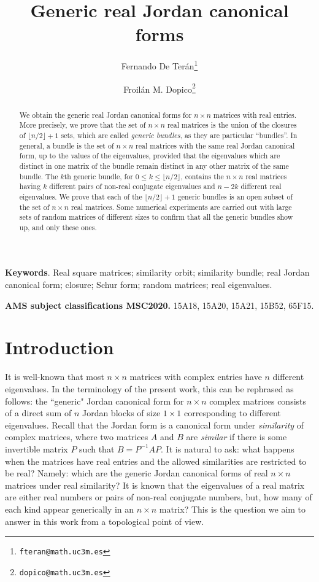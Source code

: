 \documentclass[a4paper]{article}
\title{Generic real Jordan canonical forms}
\author[1]{Fernando De Ter\'an\thanks{\tt fteran@math.uc3m.es}}
\author[1] {Froil\'an M. Dopico\thanks{\tt dopico@math.uc3m.es}}
\affil[1]{Universidad Carlos III de Madrid, ROR: https://ror.org/03ths8210, Departamento de Matemáticas, Avda. Universidad 30, 28911, Legan\'es, Spain}
\date{}
\begin{document}
\maketitle

\begin{abstract}
    We obtain the generic real Jordan canonical forms for $n\times n$ matrices with real entries. More precisely, we prove that the set of $n\times n$ real matrices is the union of the closures of $\lfloor n/2\rfloor+1$ sets, which are called {\em generic bundles}, as they are particular ``bundles''.  In general, a bundle is the set of $n\times n$ real matrices with the same real Jordan canonical form, up to the values of the eigenvalues, provided that the eigenvalues which are distinct in one matrix of the bundle remain distinct in any other matrix of the same bundle. The $k$th generic bundle, for $0\leq k\leq\lfloor n/2\rfloor$, contains the $n\times n$ real matrices having $k$ different pairs of non-real conjugate eigenvalues and $n-2k$ different real eigenvalues. We prove that each of the $\lfloor n/2\rfloor+1$ generic bundles is an open subset of the set of $n\times n$ real matrices. Some numerical experiments are carried out with large sets of random matrices of different sizes to confirm that all the generic bundles show up, and only these ones.
\end{abstract}

{\bf Keywords}. Real square matrices; similarity orbit; similarity bundle; real Jordan canonical form;  closure; Schur form; random matrices; real eigenvalues.


\medskip


{\bf AMS subject classifications MSC2020.} 15A18, 15A20, 15A21, 15B52, 65F15.


\section{Introduction}\label{intro.sec}

It is well-known that most $n\times n$ matrices with complex entries have $n$ different eigenvalues. In the terminology of the present work, this can be rephrased as follows: the ``generic" Jordan canonical form for $n\times n$ complex matrices consists of a direct sum of $n$ Jordan blocks of size $1\times1$ corresponding to different eigenvalues. Recall that the Jordan form is a canonical form under {\em similarity} of complex matrices, where two matrices $A$ and $B$ are {\em similar} if there is some invertible matrix $P$ such that $B=P^{-1}AP$. It is natural to ask: what happens when the matrices have real entries and the allowed similarities are restricted to be real? Namely: which are the generic Jordan canonical forms of real $n\times n$ matrices  under real similarity? It is known that the eigenvalues of a real matrix are either real numbers or pairs of non-real conjugate numbers, but, how many of each kind appear generically in an $n\times n$ matrix? This is the question we aim to answer in this work from a topological point of view.
\end{document}
